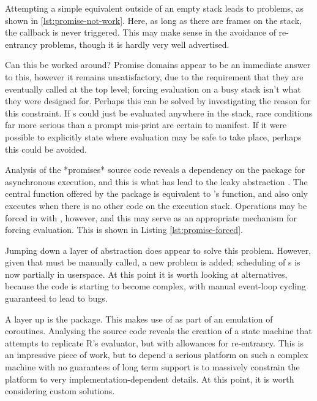 Attempting a simple equivalent outside of an empty stack leads to problems, as shown in \cref{lst:promise-not-work}.
Here, as long as there are frames on the stack, the  callback is never triggered.
This may make sense in the avoidance of re-entrancy problems, though it is hardly very well advertised.


Can this be worked around?
Promise domains appear to be an immediate answer to this, however it remains unsatisfactory, due to the requirement that they are eventually called at the top level; forcing evaluation on a busy stack isn't what they were designed for.
Perhaps this can be solved by investigating the reason for this constraint.
If s could just be evaluated anywhere in the stack, race conditions far more serious than a prompt mis-print are certain to manifest.
If it were possible to explicitly state where evaluation may be safe to take place, perhaps this could be avoided.

Analysis of the *promises* source code reveals a dependency on the  package for asynchronous execution, and this is what has lead to the leaky abstraction \cite{chang2021later}.
The central  function offered by the package is equivalent to 's  function, and also only executes when there is no other \R code on the execution stack.
Operations may be forced in  with , however, and this may serve as an appropriate mechanism for forcing evaluation.
This is shown in Listing \cref{lst:promise-forced}.


Jumping down a layer of abstraction does appear to solve this problem.
However, given that  must be manually called, a new problem is added; scheduling of s is now partially in userspace.
At this point it is worth looking at alternatives, because the code is starting to become complex, with manual event-loop cycling guaranteed to lead to bugs.

A layer up is the  package\cite{henry21coro}.
This makes use of  as part of an emulation of coroutines.
Analysing the source code reveals the creation of a state machine that attempts to replicate R's evaluator, but with allowances for re-entrancy.
This is an impressive piece of work, but to depend a serious platform on such a complex machine with no guarantees of long term support is to massively constrain the platform to very implementation-dependent details.
At this point, it is worth considering custom solutions.

